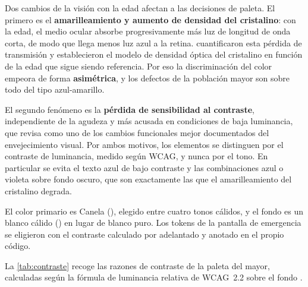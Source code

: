Dos cambios de la visión con la edad afectan a las decisiones de paleta. El primero es el \textbf{amarilleamiento y aumento de densidad del cristalino}: con la edad, el medio ocular absorbe progresivamente más luz de longitud de onda corta, de modo que llega menos luz azul a la retina. \textcite{Pokorny1987} cuantificaron esta pérdida de transmisión y establecieron el modelo de densidad óptica del cristalino en función de la edad que sigue siendo referencia. Por eso la discriminación del color empeora de forma \textbf{asimétrica}, y los defectos de la población mayor son sobre todo del tipo azul-amarillo.

El segundo fenómeno es la \textbf{pérdida de sensibilidad al contraste}, independiente de la agudeza y más acusada en condiciones de baja luminancia, que \textcite{Owsley2011} revisa como uno de los cambios funcionales mejor documentados del envejecimiento visual. Por ambos motivos, los elementos se distinguen por el contraste de luminancia, medido según WCAG, y nunca por el tono. En particular se evita el texto azul de bajo contraste y las combinaciones azul o violeta sobre fondo oscuro, que son exactamente las que el amarilleamiento del cristalino degrada.

El color primario es Canela (), elegido entre cuatro tonos cálidos, y el fondo es un blanco cálido () en lugar de blanco puro. Los tokens de la pantalla de emergencia se eligieron con el contraste calculado por adelantado y anotado en el propio código.

La \autoref{tab:contraste} recoge las razones de contraste de la paleta del mayor, calculadas según la fórmula de luminancia relativa de WCAG~2.2 \autocite{wcag} sobre el fondo .

